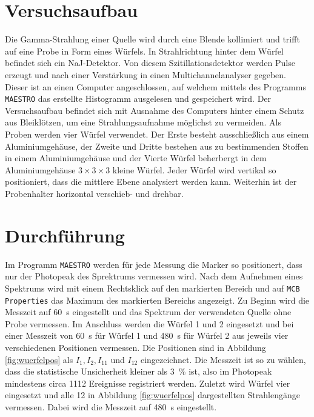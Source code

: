 \newpage
\section{Versuchsaufbau}
\label{sec:Aufbau}

Die Gamma-Strahlung einer 
Quelle wird durch eine Blende kollimiert und trifft auf eine Probe in Form
eines Würfels.
In Strahlrichtung hinter dem Würfel befindet sich ein NaJ-Detektor.
Von diesem Szitillationsdetektor werden Pulse erzeugt
und nach einer Verstärkung in einen Multichannelanalyser gegeben.
Dieser ist an einen Computer angeschlossen,
auf welchem mittels des Programms \texttt{MAESTRO}
das erstellte Histogramm ausgelesen und gespeichert wird.
Der Versuchsaufbau befindet sich mit Ausnahme des Computers hinter einem
Schutz aus Bleiklötzen, um eine Strahlungsaufnahme möglichst zu vermeiden.
Als Proben werden vier Würfel verwendet.
Der Erste besteht ausschließlich aus einem Aluminiumgehäuse, der Zweite und Dritte
bestehen aus zu bestimmenden Stoffen in einem Aluminiumgehäuse
und der Vierte Würfel beherbergt in dem Aluminiumgehäuse $3 \times 3 \times 3$
kleine Würfel.
Jeder Würfel wird vertikal so positioniert, dass die mittlere Ebene analysiert
werden kann. Weiterhin ist der Probenhalter horizontal verschieb- und drehbar.

\section{Durchführung}
\label{sec:Durchführung}

Im Programm \texttt{MAESTRO} werden für jede Messung die Marker so positionert,
dass nur der Photopeak des Sprektrums vermessen wird.
Nach dem Aufnehmen eines Spektrums
wird mit einem Rechtsklick auf den markierten Bereich und auf
\texttt{MCB Properties} das Maximum des markierten Bereichs angezeigt.
Zu Beginn wird die Messzeit auf \SI{60}{\second} eingestellt und das Spektrum
der verwendeten Quelle ohne Probe vermessen. Im Anschluss werden die
Würfel \num{1} und \num{2} eingesetzt und bei einer Messzeit von
\SI{60}{\second} für Würfel \num{1} und \SI{480}{\second} für Würfel \num{2}
aus jeweils vier verschiedenen Positionen vermessen. Die Positionen sind
in Abbildung \ref{fig:wuerfelpos} als
$I_{1}, I_{2}, I_{11}$ und $I_{12}$ eingezeichnet.
Die Messzeit ist so zu wählen, dass die statistische Unsicherheit kleiner
als \SI{3}{\percent} ist, also im Photopeak mindestens circa \num{1112}
Ereignisse registriert werden.
Zuletzt wird Würfel vier eingesetzt und alle \num{12} in Abbildung
\ref{fig:wuerfelpos} dargestellten Strahlengänge vermessen. Dabei wird die
Messzeit auf \SI{480}{\second} eingestellt.

